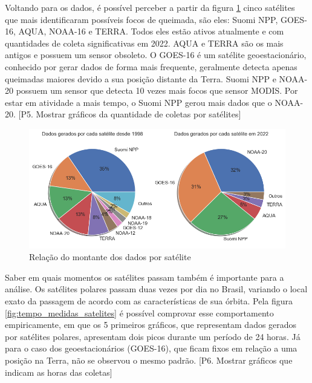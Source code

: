 \documentclass[cic,tc]{iiufrgs}
\begin{document}
Voltando para os dados, é possível perceber a partir da figura
\ref{fig:porcentagem_satelites} cinco satélites que mais identificaram possíveis 
focos de queimada, são eles: Suomi NPP, GOES-16, AQUA, NOAA-16 e TERRA. 
Todos eles estão 
ativos atualmente e com quantidades de coleta significativas em 2022. AQUA e TERRA 
são os mais antigos e possuem um sensor obsoleto. O GOES-16 é um satélite
geoestacionário, conhecido por gerar dados de forma mais frequente, geralmente 
detecta apenas queimadas maiores devido a sua posição distante da Terra. Suomi NPP e
NOAA-20 possuem um sensor que detecta 10 vezes mais focos que sensor MODIS. Por 
estar em atividade a mais tempo, o Suomi NPP gerou mais dados que o NOAA-20.
[P5. Mostrar gráficos da quantidade de coletas por satélites] \par

\begin{figure}
    \caption{Relação do montante dos dados por satélite}
    \begin{center}
        \includegraphics[width=35em]{porcentagem_satelites}
    \end{center}
    \label{fig:porcentagem_satelites}
\end{figure}

Saber em quais momentos os satélites passam também é importante para a análise. 
Os satélites polares passam duas vezes por dia no Brasil, variando o local 
exato da passagem de acordo com as características de sua órbita. Pela  
figura \ref{fig:tempo_medidas_satelites} é possível comprovar esse comportamento 
empiricamente, em que os 5 primeiros gráficos, que representam dados gerados por 
satélites polares, apresentam dois picos durante um período de 24 horas. Já para o  
caso dos geoestacionários (GOES-16), que ficam fixos em relação a uma posição 
na Terra, não se observou o mesmo padrão. 
[P6. Mostrar gráficos que indicam as horas das coletas] \par
\end{document}

